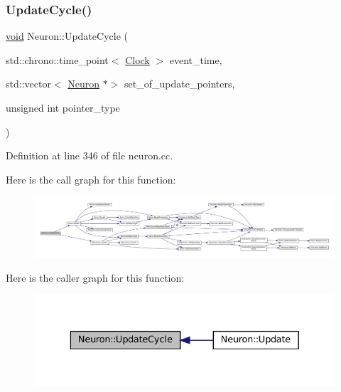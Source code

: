 \subsubsection{\texorpdfstring{Update\+Cycle()}{UpdateCycle()}}
{\footnotesize\ttfamily \mbox{\hyperlink{glad_8h_a950fc91edb4504f62f1c577bf4727c29}{void}} Neuron\+::\+Update\+Cycle (\begin{DoxyParamCaption}\item[{std\+::chrono\+::time\+\_\+point$<$ \mbox{\hyperlink{universe_8h_a0ef8d951d1ca5ab3cfaf7ab4c7a6fd80}{Clock}} $>$}]{event\+\_\+time,  }\item[{std\+::vector$<$ \mbox{\hyperlink{class_neuron}{Neuron}} $\ast$$>$}]{set\+\_\+of\+\_\+update\+\_\+pointers,  }\item[{unsigned int}]{pointer\+\_\+type }\end{DoxyParamCaption})}



Definition at line 346 of file neuron.\+cc.

Here is the call graph for this function\+:\nopagebreak
\begin{figure}[H]
\begin{center}
\leavevmode
\includegraphics[width=350pt]{class_neuron_a06f45a5d1de890da84d3644fe58ea0a9_cgraph}
\end{center}
\end{figure}
Here is the caller graph for this function\+:\nopagebreak
\begin{figure}[H]
\begin{center}
\leavevmode
\includegraphics[width=329pt]{class_neuron_a06f45a5d1de890da84d3644fe58ea0a9_icgraph}
\end{center}
\end{figure}
\mbox{\label{class_neuron_a55c72e8066caf1ad8e25a2b0b453ee69}} 
